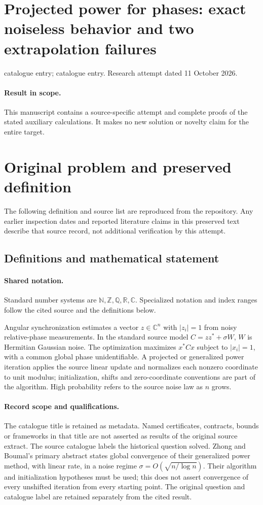 \documentclass[11pt]{article}
\begin{document}
\section*{Projected power for phases: exact noiseless behavior and two extrapolation failures}
\noindent catalogue entry; catalogue entry. Research attempt dated 11 October 2026.
\paragraph{Result in scope.}This manuscript contains a source-specific attempt and complete proofs of the stated auxiliary calculations. It makes no new solution or novelty claim for the entire target.
\section{Original problem and preserved definition}
The following definition and source list are reproduced from the repository. Any earlier inspection dates and reported literature claims in this preserved text describe that source record, not additional verification by this attempt.
\subsection{Definitions and mathematical statement}

\paragraph{Shared notation.}Standard number systems are $\mathbb N,\mathbb Z,\mathbb Q,\mathbb R,\mathbb C$. Specialized notation and index ranges follow the cited source and the definitions below.


Angular synchronization estimates a vector $z\in\mathbb C^n$ with $|z_i|=1$ from noisy relative-phase measurements. In the standard source model $C=zz^*+\sigma W$, $W$ is Hermitian Gaussian noise. The optimization maximizes $x^*Cx$ subject to $|x_i|=1$, with a common global phase unidentifiable. A projected or generalized power iteration applies the source linear update and normalizes each nonzero coordinate to unit modulus; initialization, shifts and zero-coordinate conventions are part of the algorithm. High probability refers to the source noise law as $n$ grows.
\paragraph{Record scope and qualifications.}
The catalogue title is retained as metadata. Named certificates, contracts, bounds or frameworks in that title are not asserted as results of the original source extract.
The source catalogue labels the historical question solved. Zhong and Boumal's primary abstract states global convergence of their generalized power method, with linear rate, in a noise regime $\sigma=O(\sqrt{n/\log n})$. Their algorithm and initialization hypotheses must be used; this does not assert convergence of every unshifted iteration from every starting point. The original question and catalogue label are retained separately from the cited result.
\end{document}
